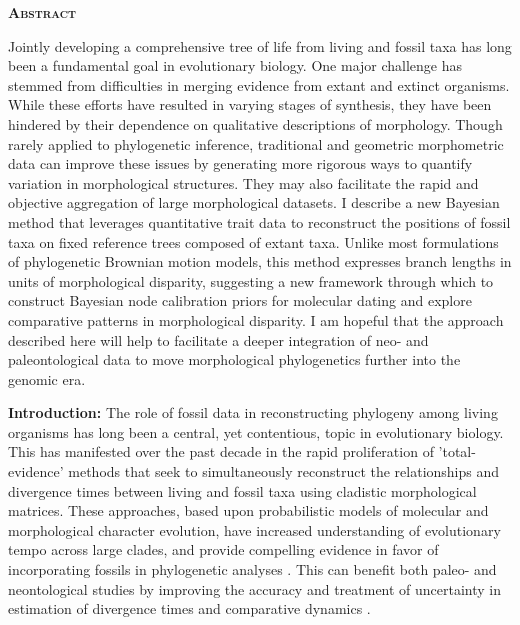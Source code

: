 \documentclass[12pt]{article}
\begin{document}
\setcounter{page}{1}

\newpage

\noindent \textbf{\textsc{Abstract}}

Jointly developing a comprehensive tree of life  from living and fossil taxa has long been a fundamental goal in evolutionary biology. One major challenge has stemmed from difficulties in merging evidence  from extant and extinct organisms.  While these efforts	 have resulted in varying stages of synthesis, they have been hindered by their dependence on  qualitative descriptions of morphology. Though rarely applied to phylogenetic inference, traditional and geometric morphometric data can improve these issues by generating more rigorous ways to quantify variation in morphological structures. They may also facilitate the rapid and objective aggregation of large morphological datasets. I describe a new Bayesian method that leverages quantitative trait data to reconstruct the positions of fossil taxa on fixed reference trees composed of extant taxa. Unlike most formulations of phylogenetic Brownian motion models, this method expresses branch lengths in units of morphological disparity, suggesting a new framework through which to construct Bayesian node calibration priors for molecular dating and explore comparative patterns in morphological disparity. I am hopeful that the approach described here will help to facilitate a deeper integration of neo- and paleontological data to move morphological phylogenetics further into the genomic era.

\newpage

\noindent\textbf{Introduction:} The role of fossil data in reconstructing
phylogeny among living organisms has long been a central, yet
contentious, topic in evolutionary biology. This has manifested over the past decade
in the rapid proliferation of 'total-evidence' methods that seek to simultaneously reconstruct the relationships
and divergence times between living and fossil taxa using cladistic morphological matrices.
 These approaches, based upon probabilistic models of molecular and
morphological character evolution, have increased understanding of evolutionary tempo across large clades,
and provide compelling evidence in favor of incorporating fossils in
phylogenetic analyses \citep{pyron2011divergence,ronquist2012total}. This can
 benefit both paleo- and neontological studies by improving the accuracy and treatment of
uncertainty in estimation of divergence times and comparative dynamics \citep{slater2012integrating,guindon2018accounting}.
\end{document}

